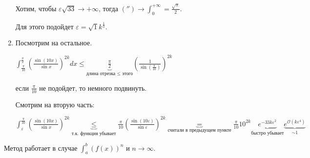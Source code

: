 \begin{example}
\begin{enumerate}
{            Хотим, чтобы $\varepsilon \sqrt{33} \rightarrow +\infty$, тогда $('') \rightarrow \int_{0}^{+\infty} = \frac{\sqrt{\pi}}{2}$.

            Для этого подойдет $\varepsilon = \sqrt{1}{k^{\frac{1}{3}}}$.
        }
        \item {
            Посмотрим на остальное.

            $\int_{\frac{\pi}{10}}^{\frac{\pi}{2}} \left( \frac{\sin{(10x)}}{\sin{x}} \right)^{2k} dx \leq \underbrace{\frac{\pi}{2}}_{\text{длина отрезка $\leq$ этого}} \left( \frac{1}{\sin{(\frac{\pi}{10})}} \right)^{2k}$

            если $\frac{\pi}{10}$ не подойдет, то немного подвинуть.

            Смотрим на вторую часть:

            $\int_{\varepsilon}^{\frac{\pi}{10}} \left( \frac{\sin{(10x)}}{\sin{x}} \right)^{2k} \underbrace{\leq}_{\text{т.к. функция убывает}} \frac{\pi}{10} \left(\frac{\sin{(10 \varepsilon)}}{\sin{\varepsilon}}\right)^{2k} \underbrace{=}_{\text{считали в предыдущем пункте}} \frac{\pi}{10} 10^{2k} \underbrace{e^{-33k \varepsilon^2}}_{\text{быстро убывает}} \underbrace{e^{\mathcal{O}(k \varepsilon^4)}}_{\sim 1}$
        }
    \end{enumerate}


    Метод работает в случае $\int_{a}^{b} \left(f(x)\right)^n$ и $n \rightarrow \infty$.
\end{example}